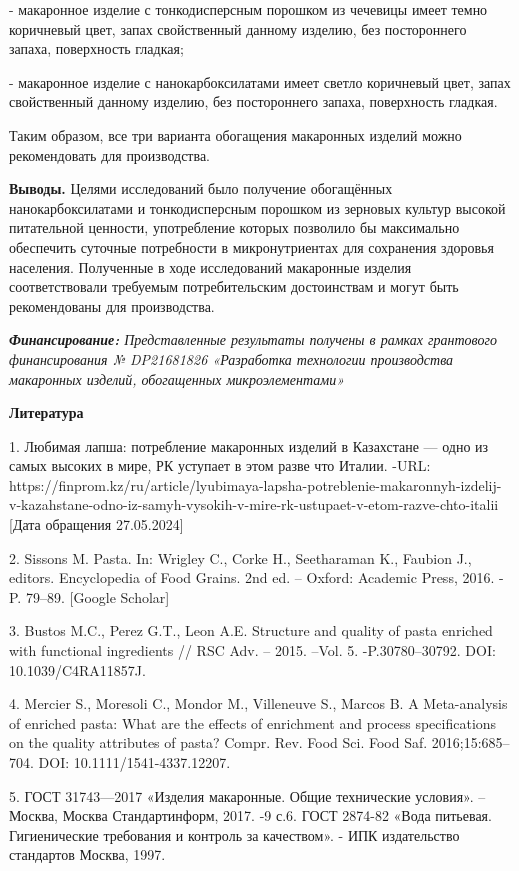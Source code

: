 - макаронное изделие с тонкодисперсным порошком из чечевицы имеет темно
коричневый цвет, запах свойственный данному изделию, без постороннего
запаха, поверхность гладкая;

- макаронное изделие с нанокарбоксилатами имеет светло коричневый цвет,
запах свойственный данному изделию, без постороннего запаха, поверхность
гладкая.

Таким образом, все три варианта обогащения макаронных изделий можно
рекомендовать для производства.

{\bfseries Выводы.} Целями исследований было получение обогащённых
нанокарбоксилатами и тонкодисперсным порошком из зерновых культур
высокой питательной ценности, употребление которых позволило бы
максимально обеспечить суточные потребности в микронутриентах для
сохранения здоровья населения. Полученные в ходе исследований макаронные
изделия соответствовали требуемым потребительским достоинствам и могут
быть рекомендованы для производства.

\emph{{\bfseries Финансирование:} Представленные результаты получены в
рамках грантового финансирования № DP21681826 «Разработка технологии
производства макаронных изделий, обогащенных микроэлементами»}

{\bfseries Литература}

1. Любимая лапша: потребление макаронных изделий в Казахстане --- одно
из самых высоких в мире, РК уступает в этом разве что Италии. -URL:
https://finprom.kz/ru/article/lyubimaya-lapsha-potreblenie-makaronnyh-izdelij-v-kazahstane-odno-iz-samyh-vysokih-v-mire-rk-ustupaet-v-etom-razve-chto-italii
{[}Дата обращения 27.05.2024{]}

2. Sissons M. Pasta. In: Wrigley C., Corke H., Seetharaman K., Faubion
J., editors. Encyclopedia of Food Grains. 2nd ed. -- Oxford: Academic
Press, 2016. - P. 79--89. {[}Google Scholar{]}

3. Bustos M.C., Perez G.T., Leon A.E. Structure and quality of pasta
enriched with functional ingredients // RSC Adv. -- 2015. --Vol. 5.
-P.30780--30792. DOI: 10.1039/C4RA11857J.

4. Mercier S., Moresoli C., Mondor M., Villeneuve S., Marcos B. A
Meta-analysis of enriched pasta: What are the effects of enrichment and
process specifications on the quality attributes of pasta? Compr. Rev.
Food Sci. Food Saf. 2016;15:685--704. DOI: 10.1111/1541-4337.12207.

5. ГОСТ 31743---2017 «Изделия макаронные. Общие технические условия».
--Москва, Москва Стандартинформ, 2017. -9 с.6. ГОСТ 2874-82 «Вода
питьевая. Гигиенические требования и контроль за качеством». - ИПК
издательство стандартов Москва, 1997.

